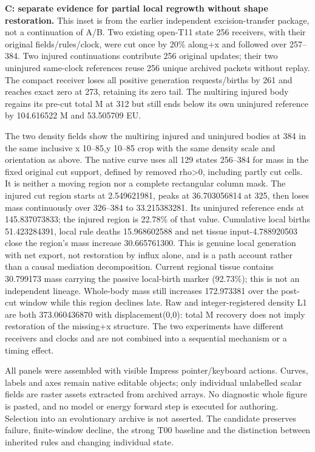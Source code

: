 \textbf{C: separate evidence for partial local regrowth without shape restoration.} This inset is from the earlier independent excision-transfer package, not a continuation of A/B. Two existing open-T11 state 256 receivers, with their original fields/rules/clock, were cut once by 20\% along+x and followed over 257--384. Two injured continuations contribute 256 original updates; their two uninjured same-clock references reuse 256 unique archived packets without replay. The compact receiver loses all positive generation requests/births by 261 and reaches exact zero at 273, retaining its zero tail. The multiring injured body regains its pre-cut total M at 312 but still ends below its own uninjured reference by 104.616522 M and 53.505709 EU.

The two density fields show the multiring injured and uninjured bodies at 384 in the same inclusive x 10--85,y 10--85 crop with the same density scale and orientation as above. The native curve uses all 129 states 256--384 for mass in the fixed original cut support, defined by removed rho>0, including partly cut cells. It is neither a moving region nor a complete rectangular column mask. The injured cut region starts at 2.549621981, peaks at 36.703056814 at 325, then loses mass continuously over 326--384 to 33.215383281. Its uninjured reference ends at 145.837073833; the injured region is 22.78\% of that value. Cumulative local births 51.423284391, local rule deaths 15.968602588 and net tissue input-4.788920503 close the region's mass increase 30.665761300. This is genuine local generation with net export, not restoration by influx alone, and is a path account rather than a causal mediation decomposition. Current regional tissue contains 30.799173 mass carrying the passive local-birth marker (92.73\%); this is not an independent lineage. Whole-body mass still increases 172.973381 over the post-cut window while this region declines late. Raw and integer-registered density L1 are both 373.060436870 with displacement(0,0): total M recovery does not imply restoration of the missing+x structure. The two experiments have different receivers and clocks and are not combined into a sequential mechanism or a timing effect.

All panels were assembled with visible Impress pointer/keyboard actions. Curves, labels and axes remain native editable objects; only individual unlabelled scalar fields are raster assets extracted from archived arrays. No diagnostic whole figure is pasted, and no model or energy forward step is executed for authoring. Selection into an evolutionary archive is not asserted. The candidate preserves failure, finite-window decline, the strong T00 baseline and the distinction between inherited rules and changing individual state.
